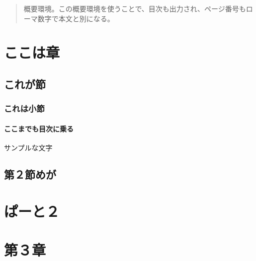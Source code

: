 \documentclass{../mnblab}
\begin{document}
\maketitle
\begin{abstract}
	概要環境。この概要環境を使うことで、目次も出力され、ページ番号もローマ数字で本文と別になる。
\end{abstract}
\pagestyle{mnblab_main}

\chapter{ここは章}
\section{これが節}
\subsection{これは小節}
\subsubsection{ここまでも目次に乗る}
サンプルな文字
\newpage
\section{第２節めが}
\chapter{ぱーと２}
\chapter{第３章}
\end{document}

